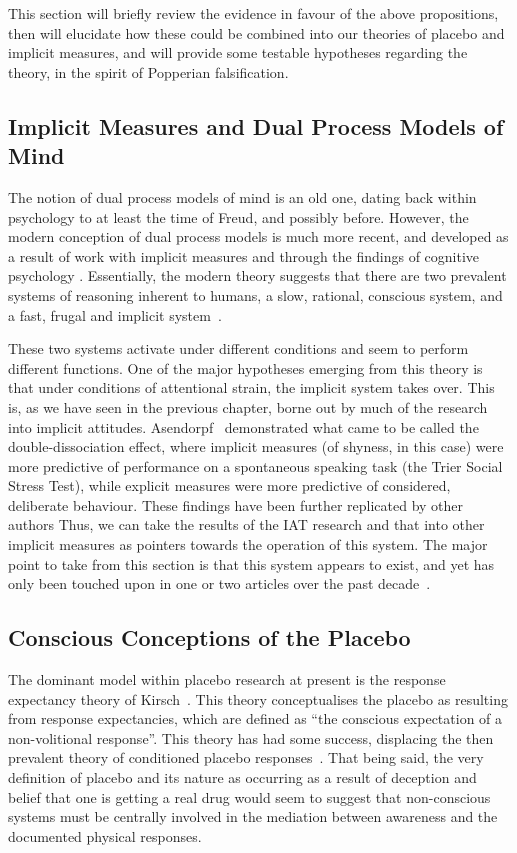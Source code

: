 This section will briefly review the evidence in favour of the above propositions, then will elucidate how these could be combined into our theories of placebo and implicit measures, and will provide some testable hypotheses regarding the theory, in the spirit of Popperian falsification.

\subsection{Implicit Measures and Dual Process Models of Mind}

The notion of dual process models of mind is an old one, dating back within psychology to at least the time of Freud, and possibly before. However, the modern conception of dual process models is much more recent, and developed as a result of work with implicit measures and through the findings of cognitive psychology \cite{Kahneman2002,Greenwald1995a,Gigerenzer2011,Klauer2007}. Essentially, the modern theory suggests that there are two prevalent systems of reasoning inherent to humans, a slow, rational, conscious system, and a fast, frugal and implicit system~\cite{Kahneman2002}. 

These two systems activate under different conditions and seem to perform different functions. One of the major hypotheses emerging from this theory is that under conditions of attentional strain, the implicit system takes over. This is, as we have seen in the previous chapter, borne out by much of the research into implicit attitudes. Asendorpf~\cite{Asendorpf2002} demonstrated what came to be called the double-dissociation effect, where implicit measures (of shyness, in this case) were more predictive of performance on a spontaneous speaking task (the Trier Social Stress Test), while explicit measures were more predictive of considered, deliberate behaviour. These findings have been further replicated by other authors   Thus, we can take the results of the IAT research and that into other implicit measures as pointers towards the operation of this system. The major point to take from this section is that this system appears to exist, and yet has only been touched upon in one or two articles over the past decade~\cite{Geers2005}. 

\subsection{Conscious Conceptions of the Placebo}

The dominant model within placebo research at present is the response expectancy theory of Kirsch~\cite{Kirsch1985, Kirsch1997}. This theory conceptualises the placebo as resulting from response expectancies, which are defined as ``the conscious expectation of a non-volitional response''. This theory has had some success, displacing the then prevalent theory of conditioned placebo responses~\cite{Voudouris1985,Voudouris1989}. That being said, the very definition of placebo and its nature as occurring as a result of deception and belief that one is getting a real drug would seem to suggest that non-conscious systems must be centrally involved in the mediation between awareness and the documented physical responses. 

